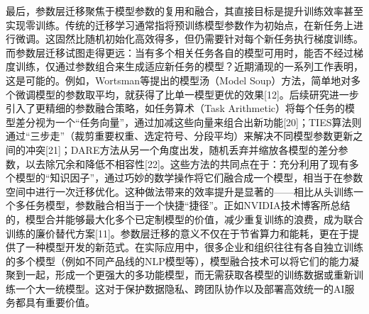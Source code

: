 最后，参数层迁移聚焦于模型参数的复用和融合，其直接目标是提升训练效率甚至实现零训练。传统的迁移学习通常指将预训练模型参数作为初始点，在新任务上进行微调。这固然比随机初始化高效得多，但仍需要针对每个新任务执行梯度训练。而参数层迁移试图走得更远：当有多个相关任务各自的模型可用时，能否不经过梯度训练，仅通过参数组合来生成适应新任务的模型？近期涌现的一系列工作表明，这是可能的。例如，Wortsman等提出的模型汤（Model Soup）方法，简单地对多个微调模型的参数取平均，就获得了比单一模型更优的效果[12]。后续研究进一步引入了更精细的参数融合策略，如任务算术（Task Arithmetic）将每个任务的模型差分视为一个“任务向量”，通过加减这些向量来组合出新功能[20]；TIES算法则通过“三步走”（裁剪重要权重、选定符号、分段平均）来解决不同模型参数更新之间的冲突[21]；DARE方法从另一个角度出发，随机丢弃并缩放各模型的差分参数，以去除冗余和降低不相容性[22]。这些方法的共同点在于：充分利用了现有多个模型的“知识因子”，通过巧妙的数学操作将它们融合成一个模型，相当于在参数空间中进行一次迁移优化。这种做法带来的效率提升是显著的——相比从头训练一个多任务模型，参数融合相当于一个快捷“捷径”。正如NVIDIA技术博客所总结的，模型合并能够最大化多个已定制模型的价值，减少重复训练的浪费，成为联合训练的廉价替代方案[11]。参数层迁移的意义不仅在于节省算力和能耗，更在于提供了一种模型开发的新范式。在实际应用中，很多企业和组织往往有各自独立训练的多个模型（例如不同产品线的NLP模型等），模型融合技术可以将它们的能力凝聚到一起，形成一个更强大的多功能模型，而无需获取各模型的训练数据或重新训练一个大一统模型。这对于保护数据隐私、跨团队协作以及部署高效统一的AI服务都具有重要价值。

